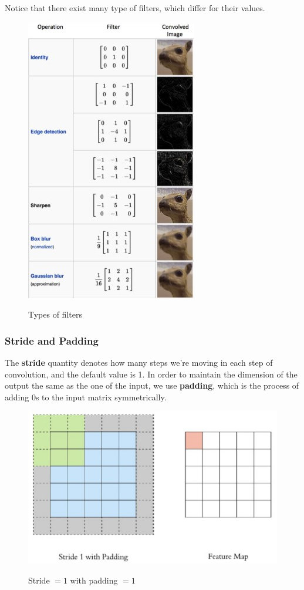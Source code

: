 Notice that there exist many type of filters, which differ for their values.

\begin{figure}[h!]
		\centering
        \includegraphics[scale = 1.5]{img/filters.jpg}
		\label{mi}
        \caption{Types of filters}
\end{figure}

\subsubsection{Stride and Padding}

The \textbf{stride} quantity denotes how many steps we're moving in each step of convolution, and the default value is 1. In order to maintain the dimension of the output the same as the one of the input, we use \textbf{padding}, which is the process of adding 0s to the input matrix symmetrically.

\begin{figure}[h!]
		\centering
        \includegraphics[scale = 1.5]{img/stride and padding.jpg}
		\label{mi}
        \caption{Stride $= 1$ with padding $ = 1$}
\end{figure}


